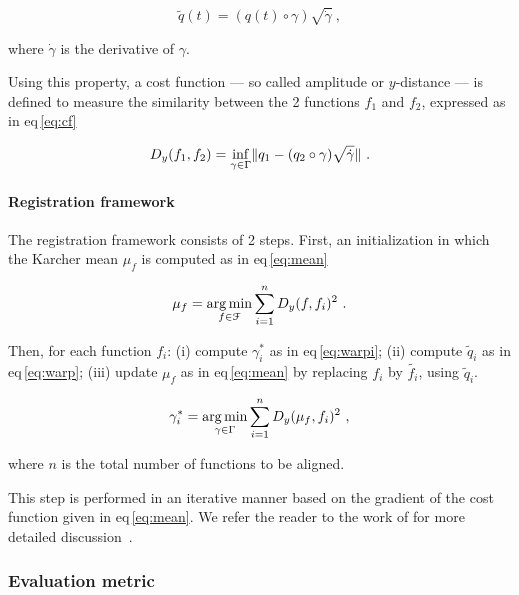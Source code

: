 \begin{equation}
  \tilde{q}(t) = (q(t) \circ \gamma) \sqrt{\dot{\gamma}} \ ,
  \label{eq:warp}
\end{equation}

\noindent where $\dot{\gamma}$ is the derivative of $\gamma$.

Using this property, a cost function --- so called amplitude or $y$-distance --- is defined to measure the similarity between the 2 functions $f_1$ and $f_2$, expressed as in \acs{eq}\,\eqref{eq:cf}

\begin{equation}
  D_y(f_1, f_2) = \underset{\gamma \in \Gamma}{\operatorname*{inf}} \| q_1 - (q_2 \circ \gamma) \sqrt{\dot{\gamma}} \| \ .
  \label{eq:cf}
\end{equation}

\paragraph{Registration framework}\label{par:chp5:T2-norm:regfra}

The registration framework consists of 2 steps.
First, an initialization in which the Karcher mean $\mu_f$ is computed as in \acs{eq}\,\eqref{eq:mean}

\begin{equation}
  \mu_f = \operatorname*{arg\,min}_{f \in \mathcal{F}} \sum_{i = 1}^{n} D_y(f, f_i)^2 \ .
  \label{eq:mean}
\end{equation}

Then, for each function $f_i$: 
(i) compute $\gamma_{i}^{*}$ as in \ac{eq}\,\eqref{eq:warpi}; 
(ii) compute $\tilde{q}_i$ as in \ac{eq}\,\eqref{eq:warp};
(iii) update $\mu_f$ as in \ac{eq}\,\eqref{eq:mean} by replacing $f_i$ by $\tilde{f_i}$, using $\tilde{q}_i$.

\begin{equation}
  \gamma_{i}^{*} = \operatorname*{arg\,min}_{\gamma \in \Gamma} \sum_{i = 1}^{n} D_y(\mu_f, f_i)^2 \ ,
  \label{eq:warpi}
\end{equation}

\noindent where $n$ is the total number of functions to be aligned.

This step is performed in an iterative manner based on the gradient of the cost function given in \acs{eq}\,\eqref{eq:mean}. 
We refer the reader to the work of \citeauthor{Srivastava2011} for more detailed discussion~\cite{Srivastava2011}.

\subsubsection{Evaluation metric}

